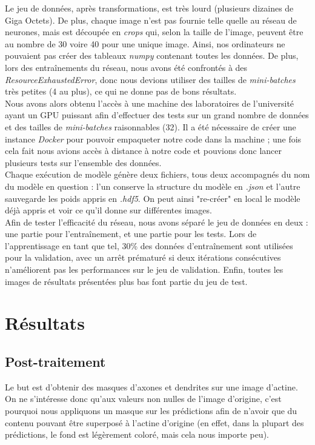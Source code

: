 \documentclass{report}
\begin{document}
Le jeu de données, après transformations, est très lourd (plusieurs dizaines de Giga Octets).
De plus, chaque image n'est pas fournie telle quelle au réseau de neurones, mais
est découpée en \textit{crops} qui, selon la taille de l'image, peuvent être au nombre
de 30 voire 40 pour une unique image. Ainsi, nos ordinateurs ne pouvaient pas
créer des tableaux \textit{numpy} contenant toutes les données. De plus, lors des
entraînements du réseau, nous avons été confrontés à des \textit{ResourceExhaustedError},
donc nous devions utiliser des tailles de \textit{mini-batches} très petites (4 au plus),
ce qui ne donne pas de bons résultats. \\
Nous avons alors obtenu l'accès à une machine des laboratoires de l'université ayant
un GPU puissant afin d'effectuer des tests sur un grand nombre de données et des
tailles de \textit{mini-batches} raisonnables (32). Il a été nécessaire de créer
une instance \textit{Docker} pour pouvoir empaqueter notre code dans la machine ;
une fois cela fait nous avions accès à distance à notre code et pouvions donc
lancer plusieurs tests sur l'ensemble des données. \\
Chaque exécution de modèle génère deux fichiers, tous deux accompagnés du nom du
modèle en question : l'un conserve la structure du modèle en \textit{.json} et
l'autre sauvegarde les poids appris en \textit{.hdf5}. On peut ainsi "re-créer"
en local le modèle déjà appris et voir ce qu'il donne sur différentes images. \\
Afin de tester l'efficacité du réseau, nous avons séparé le jeu de données en deux :
une partie pour l'entraînement, et une partie pour les tests. Lors de l'apprentissage
en tant que tel, 30\% des données d'entraînement sont utilisées pour la validation,
avec un arrêt prématuré si deux itérations consécutives n'améliorent pas les
performances sur le jeu de validation. Enfin, toutes les images de résultats
présentées plus bas font partie du jeu de test.

\chapter{Résultats}

\section{Post-traitement}

Le but est d'obtenir des masques d'axones et dendrites sur une image d'actine.
On ne s'intéresse donc qu'aux valeurs non nulles de l'image d'origine, c'est
pourquoi nous appliquons un masque sur les prédictions afin de n'avoir que du
contenu pouvant être superposé à l'actine d'origine (en effet, dans la plupart
des prédictions, le fond est légèrement coloré, mais cela nous importe peu).
\end{document}
